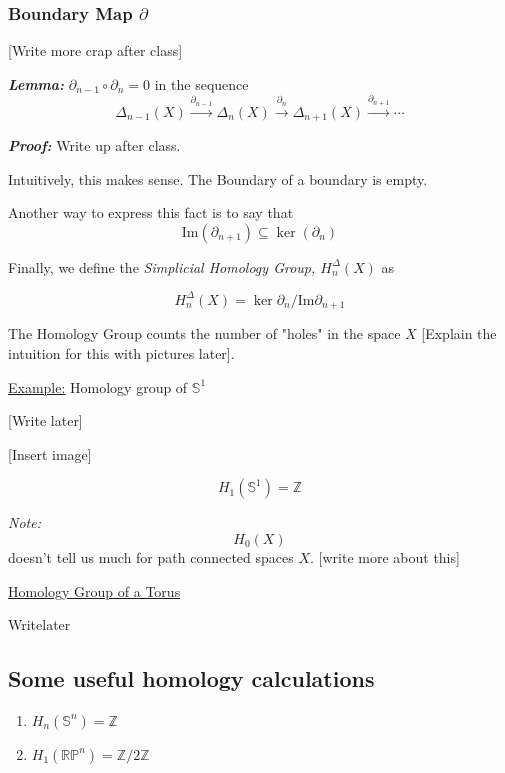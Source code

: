 \documentclass{article}
\begin{document}
\subsubsection*{Boundary Map $\partial$}

\vskip 0.5cm
[Write more crap after class]

\vskip 0.5cm
\begin{dottedbox}
  \emph{\textbf{Lemma:}} $\partial_{n-1} \circ \partial_{n} = 0$ in the sequence
  \[  \Delta_{n-1}(X) \xrightarrow{\partial_{n-1}} \Delta_n(X) \xrightarrow{\partial_n} \Delta_{n+1}(X) \xrightarrow{\partial_{n+1}} \cdots   \]
\end{dottedbox}

\vskip 0.5cm 
\emph{\textbf{Proof:}} Write up after class.

\vskip 0.5cm 
Intuitively, this makes sense. The Boundary of a boundary is empty.

\vskip 0.5cm 
Another way to express this fact is to say that 
\[ \boxed{\text{Im}\left(\partial_{n+1}\right) \subseteq \ker\left(\partial_n\right) } \]

\vskip 0.5cm
Finally, we define the \emph{Simplicial Homology Group, $H_n^{\Delta}(X)$}  as 

\begin{mathdefinitionbox}{}
  \[ H_n^{\Delta}(X) = \ker \partial_n / \text{Im} \partial_{n+1} \] 
\end{mathdefinitionbox}

\vskip 0.5cm
The Homology Group counts the number of "holes" in the space $X$ [Explain the intuition for this with pictures later].

\vskip 0.5cm
\underline{Example:} Homology group of $\mathbb{S}^1$

\vskip 0.25cm
[Write later]

\vskip 0.25cm
[Insert image]

\[ \boxed{H_1(\mathbb{S}^1) = \mathbb{Z}}\]

\vskip 0.5cm 
\begin{dottedbox}
  \emph{Note:} \[ H_0(X) \]
  doesn't tell us much for path connected spaces $X$. [write more about this]
\end{dottedbox}

\vskip 0.5cm
\underline{Homology Group of a Torus}

\vskip 0.5cm
Writelater


\vskip 1cm
\subsection{Some useful homology calculations}
\begin{enumerate}
  \item $H_n(\mathbb{S}^n) = \mathbb{Z}$
  \item $H_1\left(\mathbb{RP}^n\right) = \mathbb{Z}/2\mathbb{Z}$
\end{enumerate}
\end{document}
